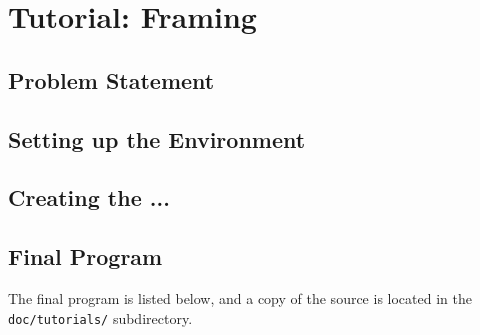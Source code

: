 % 
%

\newpage
\section{Tutorial: Framing}
\label{tutorial:framing}


%
%
\subsection{Problem Statement}
\label{tutorial:framing:problem}


%
%
\subsection{Setting up the Environment}
\label{tutorial:framing:environment}


%
%
\subsection{Creating the ...}
\label{tutorial:framing:xxx}


%
%
\subsection{Final Program}
\label{tutorial:framing:completed}

The final program is listed below,
and a copy of the source is located in the {\tt doc/tutorials/}
subdirectory.
%

%

